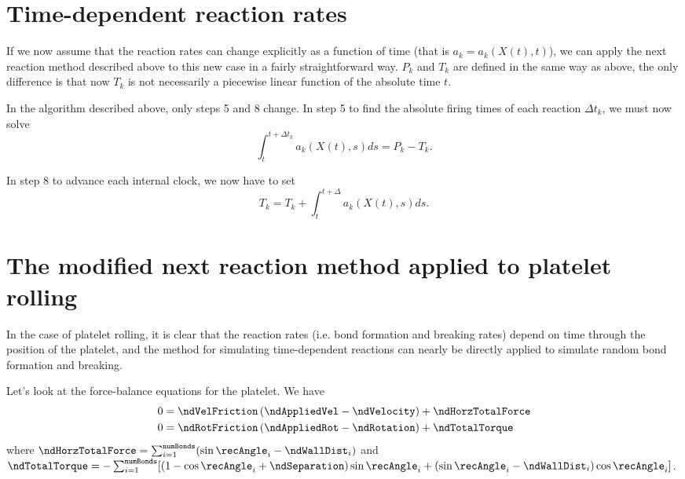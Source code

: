 \section{Time-dependent reaction rates}
\label{sec:time-depend-react}

If we now assume that the reaction rates can change explicitly as a
function of time (that is $a_k = a_k(X(t), t)$), we can apply the next
reaction method described above to this new case in a fairly
straightforward way. $P_k$ and $T_k$ are defined in the same way as
above, the only difference is that now $T_k$ is not necessarily a
piecewise linear function of the absolute time $t$.

In the algorithm described above, only steps 5 and 8 change. In step 5
to find the absolute firing times of each reaction $\Delta t_k$, we
must now solve
\begin{equation}
  \label{eq:step-5}
  \int_t^{t + \Delta t_k} a_k(X(t), s) ds = P_k - T_k.
\end{equation}

In step 8 to advance each internal clock, we now have to set
\begin{equation}
  \label{eq:step-8}
  T_k = T_k + \int_t^{t + \Delta} a_k(X(t), s) ds.
\end{equation}

\section{The modified next reaction method applied to platelet
  rolling}
\label{sec:plt-rolling}

In the case of platelet rolling, it is clear that the reaction rates
(i.e. bond formation and breaking rates) depend on time through the
position of the platelet, and the method for simulating time-dependent
reactions can nearly be directly applied to simulate random bond
formation and breaking.

Let's look at the force-balance equations for the platelet. We have
\begin{align}
  \label{eq:vel-force-bal}
  0 &= \ndVelFriction \left(\ndAppliedVel - \ndVelocity \right) +
      \ndHorzTotalForce \\
  \label{eq:rot-force-bal}
  0 &= \ndRotFriction \left(\ndAppliedRot - \ndRotation \right) +
      \ndTotalTorque
\end{align}
where $\ndHorzTotalForce = \sum_{i=1}^\texttt{numBonds}
(\sin\recAngle_i - \ndWallDist_i )$ and $\ndTotalTorque =
-\sum_{i=1}^\texttt{numBonds} [(1 - \cos\recAngle_i +
\ndSeparation)\sin\recAngle_i + (\sin\recAngle_i -
\ndWallDist_i)\cos\recAngle_i]$.

